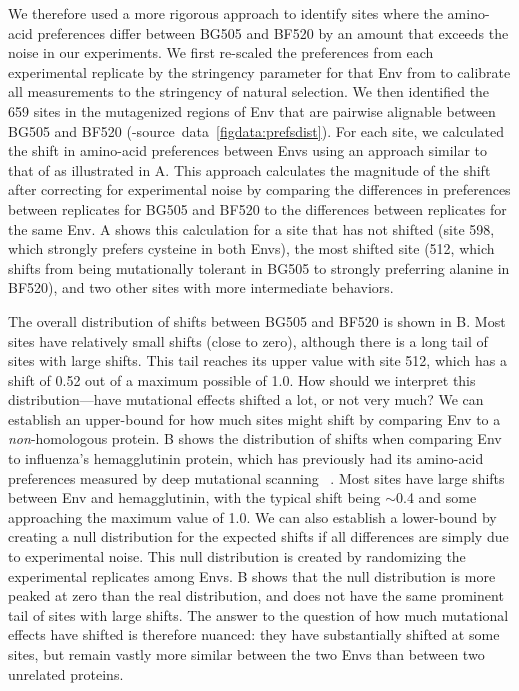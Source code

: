 \documentclass[9pt]{elife}
\begin{document}
We therefore used a more rigorous approach to identify sites where the amino-acid preferences differ between BG505 and BF520 by an amount that exceeds the noise in our experiments.
We first re-scaled the preferences from each experimental replicate by the stringency parameter for that Env from  to calibrate all measurements to the stringency of natural selection.
We then identified the 659 sites in the mutagenized regions of Env that are pairwise alignable between BG505 and BF520 (-source~data~\ref{figdata:prefsdist}).
For each site, we calculated the shift in amino-acid preferences between Envs using an approach similar to that of \citet{doud2015site} as illustrated in A.
This approach calculates the magnitude of the shift after correcting for experimental noise by comparing the differences in preferences between replicates for BG505 and BF520 to the differences between replicates for the same Env.
A shows this calculation for a site that has not shifted (site 598, which strongly prefers cysteine in both Envs), the most shifted site (512, which shifts from being mutationally tolerant in BG505 to strongly preferring alanine in BF520), and two other sites with more intermediate behaviors.

The overall distribution of shifts between BG505 and BF520 is shown in B.
Most sites have relatively small shifts (close to zero), although there is a long tail of sites with large shifts.
This tail reaches its upper value with site 512, which has a shift of 0.52 out of a maximum possible of 1.0.
How should we interpret this distribution---have mutational effects shifted a lot, or not very much?
We can establish an upper-bound for how much sites might shift by comparing Env to a \emph{non}-homologous protein.
B shows the distribution of shifts when comparing Env to influenza's hemagglutinin protein, which has previously had its amino-acid preferences measured by deep mutational scanning~\citep{doud2016accurate} .
Most sites have large shifts between Env and hemagglutinin, with the typical shift being $\sim$0.4 and some approaching the maximum value of 1.0.
We can also establish a lower-bound by creating a null distribution for the expected shifts if all differences are simply due to experimental noise.
This null distribution is created by randomizing the experimental replicates among Envs.
B shows that the null distribution is more peaked at zero than the real distribution, and does not have the same prominent tail of sites with large shifts.
The answer to the question of how much mutational effects have shifted is therefore nuanced: they have substantially shifted at some sites, but remain vastly more similar between the two Envs than between two unrelated proteins. 
\end{document}

